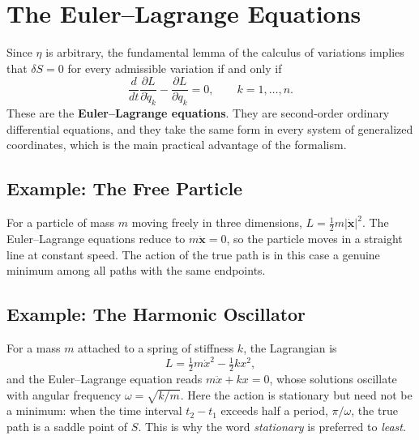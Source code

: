 \section{The Euler--Lagrange Equations}
Since $\eta$ is arbitrary, the fundamental lemma of the calculus of variations implies that $\delta S = 0$ for every admissible variation if and only if
\begin{equation}
    \frac{d}{dt} \frac{\partial L}{\partial \dot{q}_k} - \frac{\partial L}{\partial q_k} = 0, \qquad k = 1, \ldots, n.
\end{equation}
These are the \textbf{Euler--Lagrange equations}. They are second-order ordinary differential equations, and they take the same form in every system of generalized coordinates, which is the main practical advantage of the formalism.

\subsection{Example: The Free Particle}
For a particle of mass $m$ moving freely in three dimensions, $L = \tfrac{1}{2} m |\dot{\mathbf{x}}|^2$. The Euler--Lagrange equations reduce to $m \ddot{\mathbf{x}} = 0$, so the particle moves in a straight line at constant speed. The action of the true path is in this case a genuine minimum among all paths with the same endpoints.

\subsection{Example: The Harmonic Oscillator}
For a mass $m$ attached to a spring of stiffness $k$, the Lagrangian is
\begin{equation}
    L = \tfrac{1}{2} m \dot{x}^2 - \tfrac{1}{2} k x^2 ,
\end{equation}
and the Euler--Lagrange equation reads $m \ddot{x} + k x = 0$, whose solutions oscillate with angular frequency $\omega = \sqrt{k/m}$. Here the action is stationary but need not be a minimum: when the time interval $t_2 - t_1$ exceeds half a period, $\pi / \omega$, the true path is a saddle point of $S$. This is why the word \textit{stationary} is preferred to \textit{least}.

